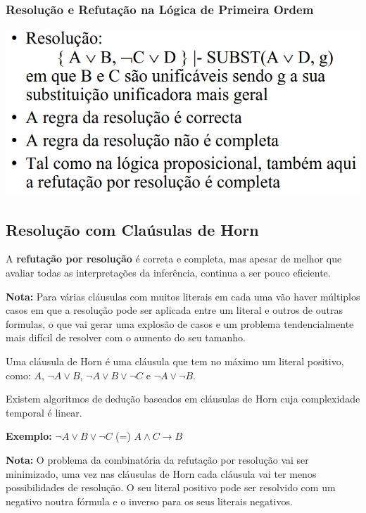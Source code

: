\documentclass{article}
\begin{document}
\subsubsection{Resolução e Refutação
na Lógica de Primeira Ordem}

\begin{center}
  \includegraphics[scale=0.3]{39}
\end{center}

\subsection{Resolução com Claúsulas de Horn}

A \textbf{refutação por resolução} é correta e completa, mas apesar de melhor que avaliar todas as
interpretações da inferência, continua a ser pouco eficiente.

\begin{flushleft}
  \textbf{Nota:} Para várias cláusulas com muitos literais em cada uma vão haver múltiplos casos em que a resolução pode ser
  aplicada entre um literal e outros de outras formulas, o que vai gerar uma explosão de casos e um problema
  tendencialmente mais difícil de resolver com o aumento do seu tamanho.
\end{flushleft}

Uma cláusula de Horn é uma cláusula que tem
no máximo um literal positivo, como: $A$, $\neg A \vee B$, $\neg A \vee B \vee \neg C$ e
$\neg A \vee \neg B$.

Existem algoritmos de dedução baseados em
cláusulas de Horn cuja complexidade temporal
é linear.

\begin{flushleft}
  \textbf{Exemplo:} $\neg A \vee B \vee \neg C$ (=) $A \wedge C \rightarrow B$
\end{flushleft}

\begin{flushleft}
  \textbf{Nota:} O problema da combinatória da refutação por resolução vai ser minimizado, uma vez nas cláusulas de Horn cada
  cláusula vai ter menos possibilidades de resolução. O seu literal positivo pode ser resolvido com um negativo noutra
  fórmula e o inverso para os seus literais negativos.
\end{flushleft}
\end{document}
